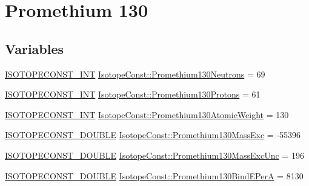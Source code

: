\hypertarget{group___isotope_const-_promethium-_pm130}{}\section{Promethium 130}
\label{group___isotope_const-_promethium-_pm130}
\subsection*{Variables}
\begin{DoxyCompactItemize}
\item 
\mbox{\hyperlink{group___isotope_const-_macros_ga5f18360b3e99483a35c32d789e62621c}{I\+S\+O\+T\+O\+P\+E\+C\+O\+N\+S\+T\+\_\+\+I\+NT}} \mbox{\hyperlink{group___isotope_const-_promethium-_pm130_ga7655ac87e790de40cdc57e3e1cfac63a}{Isotope\+Const\+::\+Promethium130\+Neutrons}} = 69
\item 
\mbox{\hyperlink{group___isotope_const-_macros_ga5f18360b3e99483a35c32d789e62621c}{I\+S\+O\+T\+O\+P\+E\+C\+O\+N\+S\+T\+\_\+\+I\+NT}} \mbox{\hyperlink{group___isotope_const-_promethium-_pm130_gae7be20c6eb95b1ca943224061fedf3bc}{Isotope\+Const\+::\+Promethium130\+Protons}} = 61
\item 
\mbox{\hyperlink{group___isotope_const-_macros_ga5f18360b3e99483a35c32d789e62621c}{I\+S\+O\+T\+O\+P\+E\+C\+O\+N\+S\+T\+\_\+\+I\+NT}} \mbox{\hyperlink{group___isotope_const-_promethium-_pm130_ga2808797b78c4d74106922dd2217c022d}{Isotope\+Const\+::\+Promethium130\+Atomic\+Weight}} = 130
\item 
\mbox{\hyperlink{group___isotope_const-_macros_ga8f45a7272ce02c0b4c65c44636ed719a}{I\+S\+O\+T\+O\+P\+E\+C\+O\+N\+S\+T\+\_\+\+D\+O\+U\+B\+LE}} \mbox{\hyperlink{group___isotope_const-_promethium-_pm130_gaac54ed5adc57182ccd711c1cf7727778}{Isotope\+Const\+::\+Promethium130\+Mass\+Exc}} = -\/55396
\item 
\mbox{\hyperlink{group___isotope_const-_macros_ga8f45a7272ce02c0b4c65c44636ed719a}{I\+S\+O\+T\+O\+P\+E\+C\+O\+N\+S\+T\+\_\+\+D\+O\+U\+B\+LE}} \mbox{\hyperlink{group___isotope_const-_promethium-_pm130_gaf9670cdd044f2b0f38f40c39381f9b56}{Isotope\+Const\+::\+Promethium130\+Mass\+Exc\+Unc}} = 196
\item 
\mbox{\hyperlink{group___isotope_const-_macros_ga8f45a7272ce02c0b4c65c44636ed719a}{I\+S\+O\+T\+O\+P\+E\+C\+O\+N\+S\+T\+\_\+\+D\+O\+U\+B\+LE}} \mbox{\hyperlink{group___isotope_const-_promethium-_pm130_ga129882d9167961e67a7141da48f66366}{Isotope\+Const\+::\+Promethium130\+Bind\+E\+PerA}} = 8130
\item 

\end{DoxyCompactItemize}
